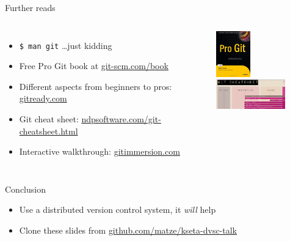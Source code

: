 \documentclass[18pt]{beamer}
\begin{document}
\begin{frame}{Further reads}
  \begin{columns}[T,onlytextwidth]
      \begin{itemize}
        \item \texttt{\$ man git} \ldots just kidding
        \item Free Pro Git book at \url{git-scm.com/book}
        \item Different aspects from beginners to pros: \url{gitready.com}
        \item Git cheat sheet: \url{ndpsoftware.com/git-cheatsheet.html}
        \item Interactive walkthrough: \url{gitimmersion.com}
      \end{itemize}

      \centering
      \includegraphics[width=1.5cm]{images/pro-git}
      \vspace{2em}
      \includegraphics[width=3cm]{images/gcs}
  \end{columns}
\end{frame}

\begin{frame}{Conclusion}
  \begin{itemize}
    \item Use a distributed version control system, it \emph{will} help
    \item Clone these slides from \url{github.com/matze/kseta-dvsc-talk}
  \end{itemize}
\end{frame}
\end{document}
